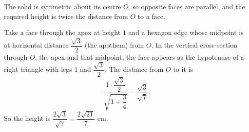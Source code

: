 The solid is symmetric about its centre $O$, so opposite faces are parallel, and the required height is twice the distance from $O$ to a face.

Take a face through the apex at height $1$ and a hexagon edge whose midpoint is at horizontal distance $\dfrac{\sqrt3}2$ (the apothem) from $O$. In the vertical cross-section through $O$, the apex and that midpoint, the face appears as the hypotenuse of a right triangle with legs $1$ and $\dfrac{\sqrt3}2$. The distance from $O$ to it is
\[\dfrac{1\cdot\dfrac{\sqrt3}2}{\sqrt{1+\dfrac34}}=\dfrac{\sqrt3}{\sqrt7}.\]
So the height is $\dfrac{2\sqrt3}{\sqrt7}=\boxed{\dfrac{2\sqrt{21}}7}$ cm.
